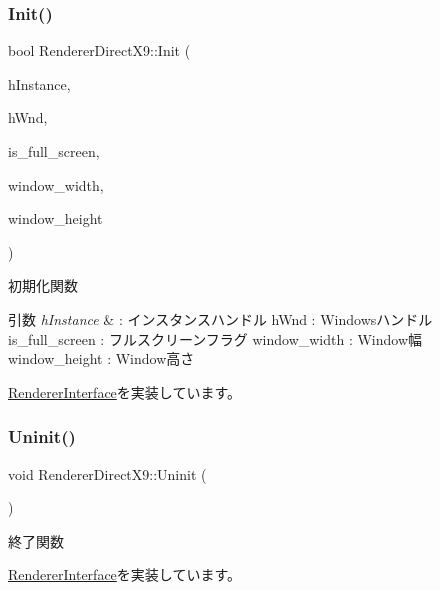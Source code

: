 \subsubsection{\texorpdfstring{Init()}{Init()}}
{\footnotesize\ttfamily bool Renderer\+Direct\+X9\+::\+Init (\begin{DoxyParamCaption}\item[{H\+I\+N\+S\+T\+A\+N\+CE}]{h\+Instance,  }\item[{H\+W\+ND}]{h\+Wnd,  }\item[{B\+O\+OL}]{is\+\_\+full\+\_\+screen,  }\item[{int}]{window\+\_\+width,  }\item[{int}]{window\+\_\+height }\end{DoxyParamCaption})\hspace{0.3cm}{\ttfamily [virtual]}}



初期化関数 


\begin{DoxyParams}{引数}
{\em h\+Instance} & \+: インスタンスハンドル h\+Wnd \+: Windowsハンドル is\+\_\+full\+\_\+screen \+: フルスクリーンフラグ window\+\_\+width \+: Window幅 window\+\_\+height \+: Window高さ \\
\hline
\end{DoxyParams}


\mbox{\hyperlink{class_renderer_interface_aabef76c27c2332c1af2dbcf7e8de5d38}{Renderer\+Interface}}を実装しています。

\mbox{\label{class_renderer_direct_x9_a61c375254fc0a827873fb4c72181f0d5}} 
\subsubsection{\texorpdfstring{Uninit()}{Uninit()}}
{\footnotesize\ttfamily void Renderer\+Direct\+X9\+::\+Uninit (\begin{DoxyParamCaption}{ }\end{DoxyParamCaption})\hspace{0.3cm}{\ttfamily [virtual]}}



終了関数 



\mbox{\hyperlink{class_renderer_interface_ada105489f9db98e7e9542b278699d558}{Renderer\+Interface}}を実装しています。



